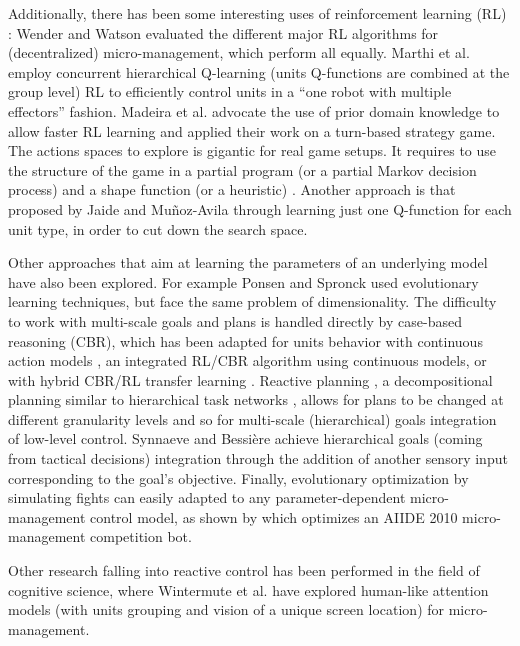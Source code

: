 \documentclass[journal]{IEEEtran}
\begin{document}
Additionally, there has been some interesting uses of reinforcement learning (RL) \cite{Sutton}: 
Wender and Watson \cite{WenderRL} evaluated the different major RL algorithms for (decentralized) micro-management, which perform all equally. Marthi et al. \cite{Marthi05} employ concurrent hierarchical Q-learning (units Q-functions are combined at the group level) RL to efficiently control units in a ``one robot with multiple effectors'' fashion. Madeira et al. \cite{Madeira06} advocate the use of prior domain knowledge to allow faster RL learning and applied their work on a turn-based strategy game. The actions spaces to explore is gigantic for real game setups. It requires to use the structure of the game in a partial program (or a partial Markov decision process) and a shape function (or a heuristic) \cite{Marthi05}. Another approach is that proposed by Jaide and Mu{\~n}oz-Avila \cite{jaidee2012classq} through learning just one Q-function for each unit type, in order to cut down the search space. 

Other approaches that aim at learning the parameters of an underlying model have also been explored. For example Ponsen and Spronck \cite{GA} used evolutionary learning techniques, but face the same problem of dimensionality. The difficulty to work with multi-scale goals and plans is handled directly by case-based reasoning (CBR), which has been adapted for units behavior with continuous action models \cite{Molineaux08}, an integrated RL/CBR algorithm using continuous models, or with hybrid CBR/RL transfer learning \cite{CBR-RL}. Reactive planning \cite{WeberCig10}, a decompositional planning similar to hierarchical task networks \cite{HTNPlanning}, allows for plans to be changed at different granularity levels and so for multi-scale (hierarchical) goals integration of low-level control. Synnaeve and Bessi\`{e}re \cite{SynnaeveMicroCig11} achieve hierarchical goals (coming from tactical decisions) integration through the addition of another sensory input corresponding to the goal's objective. Finally, evolutionary optimization by simulating fights can easily adapted to any parameter-dependent micro-management control model, as shown by \cite{OthmanSimu} which optimizes an AIIDE 2010 micro-management competition bot.


Other research falling into reactive control has been performed in the field of cognitive science, where Wintermute et al. \cite{SORTS} have explored human-like attention models (with units grouping and vision of a unique screen location) for micro-management.
\end{document}
